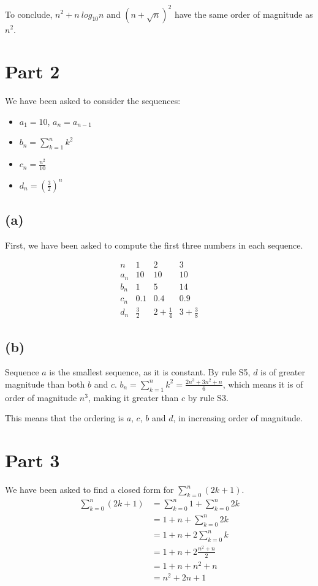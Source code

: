 \documentclass[a4paper]{article}
\begin{document}
\noindent To conclude, $n^2 + n ~ log_{10} n$ and $(n + \sqrt{n})^2$ have the same order of magnitude as $n^2$.

\clearpage \section{Part 2}

We have been asked to consider the sequences:

\begin{itemize}
\item $a_1 = 10$, $a_n = a_{n-1}$
\item $b_n = \sum\limits_{k=1}^{n}{k^2}$
\item $c_n = \frac{n^2}{10}$
\item $d_n = (\frac{3}{2})^n$
\end{itemize}

\subsection{(a)}

First, we have been asked to compute the first three numbers in each sequence.

$$
\begin{array}{l|c|c|c}
n & 1 & 2 & 3\\
\hline
a_n & 10 & 10 & 10\\
\hline
b_n & 1 & 5 & 14\\
\hline
c_n & 0.1 & 0.4 & 0.9\\
\hline
d_n & \frac{3}{2} & 2 + \frac{1}{4} & 3 + \frac{3}{8}
\end{array}
$$

\subsection{(b)}

Sequence $a$ is the smallest sequence, as it is constant. By rule S5, $d$ is of greater magnitude than both $b$ and $c$. $b_n = \sum\limits_{k=1}^{n}{k^2} = \frac{2 n^3 + 3 n^2 + n}{6}$, which means it is of order of magnitude $n^3$, making it greater than $c$ by rule S3.

This means that the ordering is $a$, $c$, $b$ and $d$, in increasing order of magnitude.

\section{Part 3}

We have been asked to find a closed form for $\sum\limits_{k=0}^{n}{(2k + 1)}$.
$$
\begin{aligned}
\sum\limits_{k=0}^{n}{(2k + 1)} &= \sum\limits_{k=0}^{n}{1} + \sum\limits_{k=0}^{n}{2k}\\
&= 1 + n + \sum\limits_{k=0}^{n}{2k} \\
&= 1 + n + 2 \sum\limits_{k=0}^{n}{k} \\
&= 1 + n + 2 \frac{n^2 + n}{2} \\
&= 1 + n + n^2 + n \\
&= n^2 + 2n + 1\\
\end{aligned}
$$
\end{document}
